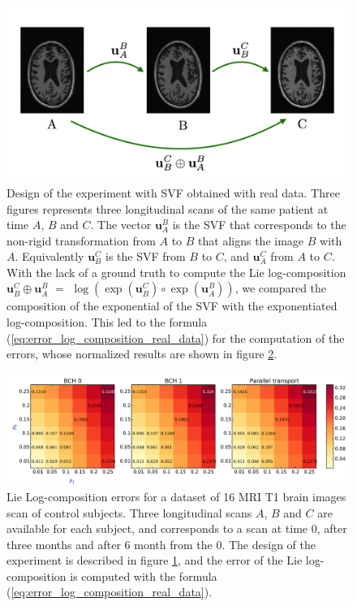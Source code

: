 \begin{figure}[!ht]
	\centering
	\includegraphics[scale=0.25]{figures/three_brains_problem.pdf}
	\caption{Design of the experiment with SVF obtained with real data. Three figures represents three  longitudinal scans of the same patient at time $A$, $B$ and $C$. The vector $\mathbf{u}_{A}^{B}$ is the SVF that corresponds to the non-rigid transformation from $A$ to $B$ that aligns the image $B$ with $A$. Equivalently $\mathbf{u}_{B}^{C}$ is the SVF from $B$ to $C$, and $\mathbf{u}_{A}^{C}$ from $A$ to $C$. 
	With the lack of a ground truth to compute the Lie log-composition $\mathbf{u}_{B}^{C} \oplus \mathbf{u}_{A}^{B}$ $=$
	$\log(\exp(\mathbf{u}_{B}^{C}) \circ\exp(\mathbf{u}_{A}^{B}))$, we compared the composition of the exponential of the SVF with the exponentiated log-composition. This led to the formula (\ref{eq:error_log_composition_real_data}) for the computation of the errors, whose normalized results are shown in figure \ref{fig:svf_log_composition_real_data_CTL_expo}. }
	\label{fig:three_brains_problem}
\end{figure}

\begin{figure}[!ht]
	\hspace{-1.0cm}
	\includegraphics[scale=0.53]{figures/svf_log_composition_real_data_CTL_expo.pdf}
	\caption{Lie Log-composition errors for a dataset of 16 MRI T1 brain images scan of control subjects. Three longitudinal scans $A$, $B$ and $C$ are available for each subject, and corresponds to a scan at time $0$, after three months and after $6$ month from the $0$. The design of the experiment is described in figure \ref{fig:three_brains_problem}, and the error of the Lie log-composition is computed with the formula (\ref{eq:error_log_composition_real_data}).}
	\label{fig:svf_log_composition_real_data_CTL_expo}
\end{figure}

